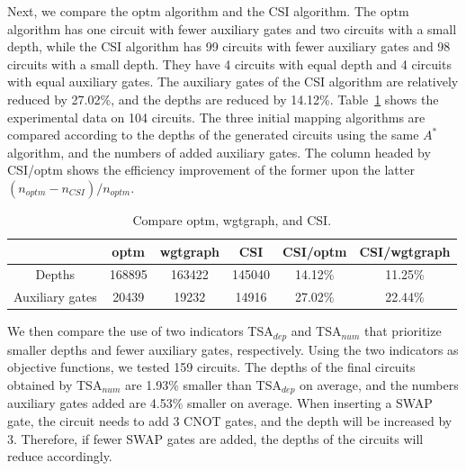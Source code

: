 \documentclass[runningheads]{llncs}
\begin{document}
Next, we compare the optm algorithm and the CSI algorithm. The optm algorithm has one circuit with fewer auxiliary gates and two circuits with a small depth, while the CSI algorithm has 99 circuits with fewer auxiliary gates and 98 circuits with a small depth.  
They have 4 circuits with equal depth and 4 circuits with equal auxiliary gates. The auxiliary gates of the CSI algorithm are relatively reduced by 27.02\%, and the depths are reduced by 14.12\%. Table~\ref{tab1} shows the experimental data on 104 circuits. The three initial mapping algorithms are compared according to the depths of the generated circuits using the same $A^{*}$ algorithm, and the numbers of added auxiliary gates. The column headed by CSI/optm  shows the efficiency improvement of the former upon the latter $(n_{optm}-n_{CSI})/n_{optm}$.
\begin{table}
	\begin{center}  
	\begin{tabular}{|c|c|c|c|c|c|}
	\hline
	    	&  optm & wgtgraph &CSI& CSI/optm & CSI/wgtgraph\\
	\hline
	 Depths 	&	168895	&   163422	&  145040 	& 14.12\%  &11.25\%   \\
	\hline
	 Auxiliary gates 	&	20439	&  19232 	&  14916 & 27.02\% 	&  22.44\%  \\
	\hline
	\end{tabular} 
	\end{center} 
	\caption{Compare optm, wgtgraph, and CSI.}
	\label{tab1}
	\end{table}

	We then compare the use of two indicators TSA$_{dep}$ and TSA$_{num}$ that prioritize smaller depths and fewer auxiliary gates, respectively. Using the two indicators  as objective functions, we tested 159 circuits. The depths of the final circuits obtained by TSA$_{num}$ are 1.93\% smaller than TSA$_{dep}$ on average, and the numbers auxiliary gates added are 4.53\% smaller on average. When inserting a SWAP gate, the circuit needs to add 3 CNOT gates, and the depth will be increased by 3.  Therefore, if fewer SWAP gates are added, the depths of the circuits will reduce accordingly. 
\end{document}
